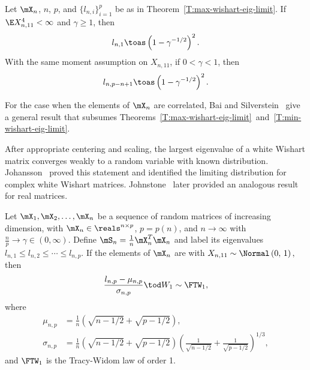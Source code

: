 \begin{theorem}\label{T:min-wishart-eig-limit}
    Let $\mX_n$, $n$, $p$, and $\{ l_{n,i} \}_{i=1}^p$ be as in
    Theorem~\ref{T:max-wishart-eig-limit}.  If $\E X_{n,11}^4 < \infty$ and
    $\gamma \geq 1$, then
    \[
        l_{n,1} \toas \left( 1 - \gamma^{-1/2} \right)^2.
    \]
    With the same moment assumption on $X_{n,11}$, if $0 < \gamma < 1$, then
    \[
        l_{n,p-n+1} \toas \left( 1 - \gamma^{-1/2} \right)^2.
    \]
\end{theorem}

\noindent
For the case when the elements of $\mX_n$ are correlated, Bai and Silverstein~\cite{bai1998neo} give a general result that subsumes Theorems~\ref{T:max-wishart-eig-limit}~and~\ref{T:min-wishart-eig-limit}.

After appropriate centering and scaling, the largest eigenvalue of a white
Wishart matrix converges weakly to a random variable with known distribution.
Johansson~\cite{johansson2000sfa} proved this statement and identified the
limiting distribution for complex white Wishart matrices.  Johnstone~\cite{johnstone2001dle} later provided an analogous result for real matrices.  

\begin{theorem}\label{T:tw-limit-largest}
    Let $\mX_1, \mX_2, \ldots, \mX_n$ be a sequence of random matrices of
    increasing dimension, with $\mX_n \in \reals^{n\times p}$, $p = p(n)$,
    and $n \to \infty$ with $\frac{n}{p} \to \gamma \in (0, \infty)$.  Define
    $\mS_n = \frac{1}{n} \mX_n^T \mX_n$ and label its eigenvalues
    \(
        l_{n,1} \leq l_{n,2} \leq \cdots \leq l_{n,p}.
    \)
    If the elements of $\mX_n$ are \iid with
    \(
        X_{n,11} \sim \Normal\left( 0, \, 1 \right),
    \)
    then
    \[
        \frac{l_{n,p} - \mu_{n,p}}{\sigma_{n,p}}
        \tod
        W_1
        \sim
        \FTW_1,
    \]
    where
    \begin{align*}
        \mu_{n,p} 
            &=
            \frac{1}{n}
            \left(
                \sqrt{n - 1/2}
                +
                \sqrt{p - 1/2}
            \right), \\
        \sigma_{n,p}
            &= 
            \frac{1}{n}
            \left(
                \sqrt{n - 1/2}
                +
                \sqrt{p - 1/2}
            \right)
            \left(
                \frac{1}{\sqrt{n - 1/2}}
                +
                \frac{1}{\sqrt{p - 1/2}}
            \right)^{1/3},
    \end{align*}
    and $\FTW_1$ is the Tracy-Widom law of order 1.
\end{theorem}

